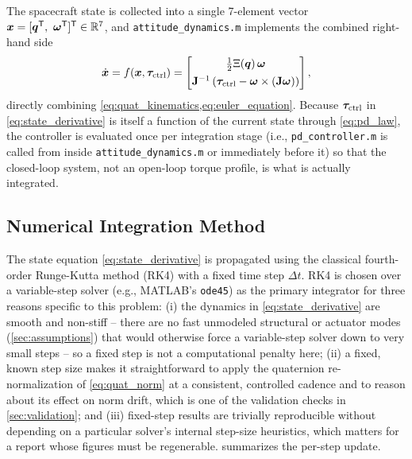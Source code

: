 The spacecraft state is collected into a single 7-element vector $\bm{x} = [\bm{q}^{\mathsf{T}},\ \bm{\omega}^{\mathsf{T}}]^{\mathsf{T}} \in \mathbb{R}^7$, and \texttt{attitude\_dynamics.m} implements the combined right-hand side
\begin{equation}
    \dot{\bm{x}} = f(\bm{x}, \bm{\tau}_{\text{ctrl}}) = \begin{bmatrix} \tfrac{1}{2}\Xi(\bm{q})\,\bm{\omega} \\[4pt] \mathbf{J}^{-1}\left(\bm{\tau}_{\text{ctrl}} - \bm{\omega}\times(\mathbf{J}\bm{\omega})\right) \end{bmatrix},
    \label{eq:state_derivative}
\end{equation}
directly combining \cref{eq:quat_kinematics,eq:euler_equation}. Because $\bm{\tau}_{\text{ctrl}}$ in \cref{eq:state_derivative} is itself a function of the current state through \cref{eq:pd_law}, the controller is evaluated once per integration stage (i.e., \texttt{pd\_controller.m} is called from inside \texttt{attitude\_dynamics.m} or immediately before it) so that the closed-loop system, not an open-loop torque profile, is what is actually integrated.

\subsection{Numerical Integration Method}
\label{sec:integration}

The state equation \cref{eq:state_derivative} is propagated using the classical fourth-order Runge-Kutta method (RK4) with a fixed time step $\Delta t$. RK4 is chosen over a variable-step solver (e.g., MATLAB's \texttt{ode45}) as the primary integrator for three reasons specific to this problem: (i) the dynamics in \cref{eq:state_derivative} are smooth and non-stiff -- there are no fast unmodeled structural or actuator modes (\cref{sec:assumptions}) that would otherwise force a variable-step solver down to very small steps -- so a fixed step is not a computational penalty here; (ii) a fixed, known step size makes it straightforward to apply the quaternion re-normalization of \cref{eq:quat_norm} at a consistent, controlled cadence and to reason about its effect on norm drift, which is one of the validation checks in \cref{sec:validation}; and (iii) fixed-step results are trivially reproducible without depending on a particular solver's internal step-size heuristics, which matters for a report whose figures must be regenerable.  summarizes the per-step update.

